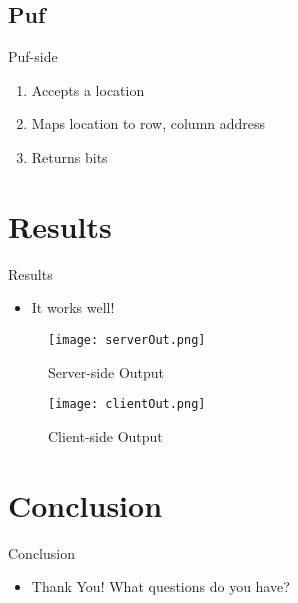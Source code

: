 \documentclass[presentation]{beamer}
\begin{document}
\subsection{Puf}
\begin{frame}{Puf-side}
  \begin{enumerate}
    \item Accepts a location
      \pause
    \item Maps location to row, column address
      \pause
    \item Returns bits
  \end{enumerate}
\end{frame}
\section{Results}
\begin{frame}{Results}
  \begin{itemize}
      \item It works well!
  \end{itemize}
  \begin{figure}[h]
    \centering
    \texttt{[image: serverOut.png]}
    \caption{Server-side Output }
  \end{figure}
  \begin{figure}[h]
    \centering
    \texttt{[image: clientOut.png]}
    \caption{Client-side Output}
  \end{figure}

\end{frame}                   
\section{Conclusion}
\begin{frame}{Conclusion}
  \begin{itemize}
      \item Thank You! What questions do you have?
      \end{itemize}
\end{frame}
\end{document}
